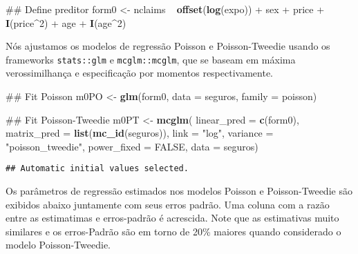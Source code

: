 \documentclass[9pt,a5paper,]{book}
\newenvironment{Shaded}{}{}
\newcommand{\KeywordTok}[1]{\textbf{{#1}}}
\newcommand{\DataTypeTok}[1]{\underline{{#1}}}
\newcommand{\DecValTok}[1]{{#1}}
\newcommand{\StringTok}[1]{{#1}}
\newcommand{\OtherTok}[1]{{#1}}
\newcommand{\NormalTok}[1]{{#1}}
\renewenvironment{Shaded}{\color{inputcolor}}{}
\renewcommand{\DataTypeTok}[1]{{#1}}
\theoremstyle{definition}
\theoremstyle{definition}
\theoremstyle{remark}
\begin{document}
\begin{Shaded}
\begin{Highlighting}[]
\NormalTok{## Define preditor}
\NormalTok{form0 <-}\StringTok{ }\NormalTok{nclaims ~}\StringTok{ }\KeywordTok{offset}\NormalTok{(}\KeywordTok{log}\NormalTok{(expo)) +}\StringTok{ }\NormalTok{sex +}
\StringTok{    }\NormalTok{price +}\StringTok{ }\KeywordTok{I}\NormalTok{(price^}\DecValTok{2}\NormalTok{) +}\StringTok{ }\NormalTok{age +}\StringTok{ }\KeywordTok{I}\NormalTok{(age^}\DecValTok{2}\NormalTok{)}
\end{Highlighting}
\end{Shaded}

Nós ajustamos os modelos de regressão Poisson e Poisson-Tweedie usando
os frameworks \texttt{stats::glm} e \texttt{mcglm::mcglm}, que se baseam
em máxima verossimilhança e especificação por momentos respectivamente.

\begin{Shaded}
\begin{Highlighting}[]
\NormalTok{## Fit Poisson}
\NormalTok{m0PO <-}\StringTok{ }\KeywordTok{glm}\NormalTok{(form0, }\DataTypeTok{data =} \NormalTok{seguros, }\DataTypeTok{family =} \NormalTok{poisson)}

\NormalTok{## Fit Poisson-Tweedie}
\NormalTok{m0PT <-}\StringTok{ }\KeywordTok{mcglm}\NormalTok{(}
    \DataTypeTok{linear_pred =} \KeywordTok{c}\NormalTok{(form0),}
    \DataTypeTok{matrix_pred =} \KeywordTok{list}\NormalTok{(}\KeywordTok{mc_id}\NormalTok{(seguros)),}
    \DataTypeTok{link =} \StringTok{"log"}\NormalTok{,}
    \DataTypeTok{variance =} \StringTok{"poisson_tweedie"}\NormalTok{,}
    \DataTypeTok{power_fixed =} \OtherTok{FALSE}\NormalTok{,}
    \DataTypeTok{data =} \NormalTok{seguros)}
\end{Highlighting}
\end{Shaded}

\begin{verbatim}
## Automatic initial values selected.
\end{verbatim}

Os parâmetros de regressão estimados nos modelos Poisson e
Poisson-Tweedie são exibidos abaixo juntamente com seus erros padrão.
Uma coluna com a razão entre as estimatimas e erros-padrão é acrescida.
Note que as estimativas muito similares e os erros-Padrão são em torno
de 20\% maiores quando considerado o modelo Poisson-Tweedie.

\begin{Shaded}
\end{Shaded}
\end{document}
